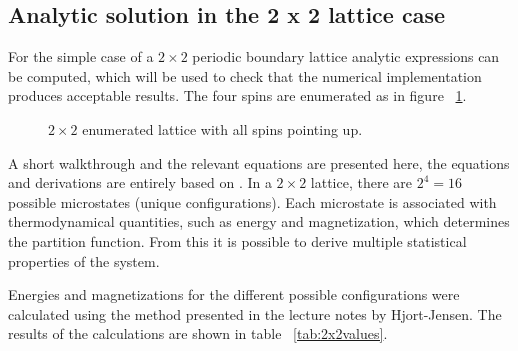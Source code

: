 \documentclass[aps,reprint]{revtex4-1}
\begin{document}
\subsection{Analytic solution in the 2 x 2 lattice case}
For the simple case of a $2 \times 2$ periodic boundary lattice analytic
expressions can be computed, which will be used to check that the numerical
implementation produces acceptable results. The four spins are enumerated as in
figure ~\ref{fig:22lattice}.
\begin{figure}
  \centering
  \caption{$2 \times 2$ enumerated lattice with all spins pointing up.}
  \label{fig:22lattice}
\end{figure}
A short walkthrough and the relevant equations are presented here, the equations
and derivations are entirely based on \cite{mortenjensen}. In a $2 \times 2$
lattice, there are $2^4 = 16$ possible microstates (unique configurations). Each
microstate is associated with thermodynamical quantities, such as energy and
magnetization, which determines the partition function. From this it is possible
to derive multiple statistical properties of the system.

Energies and magnetizations for the different possible configurations were calculated
using the method presented in the lecture notes by Hjort-Jensen.
The results of the calculations are shown in table ~\ref{tab:2x2values}.
\end{document}
